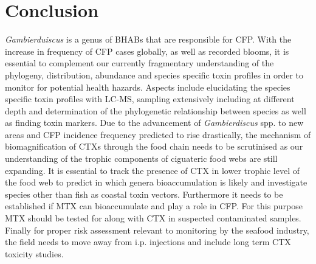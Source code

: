\documentclass[12pt]{article}
\begin{document}
\section{Conclusion}
\emph{Gambierduiscus} is a genus of BHABs that are responsible for CFP. With the increase in frequency of CFP cases globally, as well as recorded blooms, it is essential to complement our currently fragmentary understanding of the phylogeny, distribution, abundance and species specific toxin profiles in order to monitor for potential health hazards. Aspects include elucidating the species specific toxin profiles with LC-MS, sampling extensively including at different depth and determination of the phylogenetic relationship between species as well as finding toxin markers.
Due to the  advancement of \emph{Gambierdiscus} spp. to new areas and CFP incidence frequency predicted to rise drastically, the mechanism of biomagnification of CTXs through the food chain needs to be scrutinised as our understanding of the trophic components of ciguateric food webs are still expanding.
It is essential to track the presence of CTX in lower trophic level of the food web to predict in which genera bioaccumulation is likely \cite{mak2013pacific} and investigate species other than fish as coastal toxin vectors. Furthermore it needs to be established if MTX can bioaccumulate and play a role in CFP. For this purpose MTX should be tested for along with CTX in suspected contaminated samples.
Finally for proper risk assessment relevant to monitoring by the seafood industry, the field needs to move away from i.p. injections and include long term CTX toxicity studies.


\newpage



\end{document}
